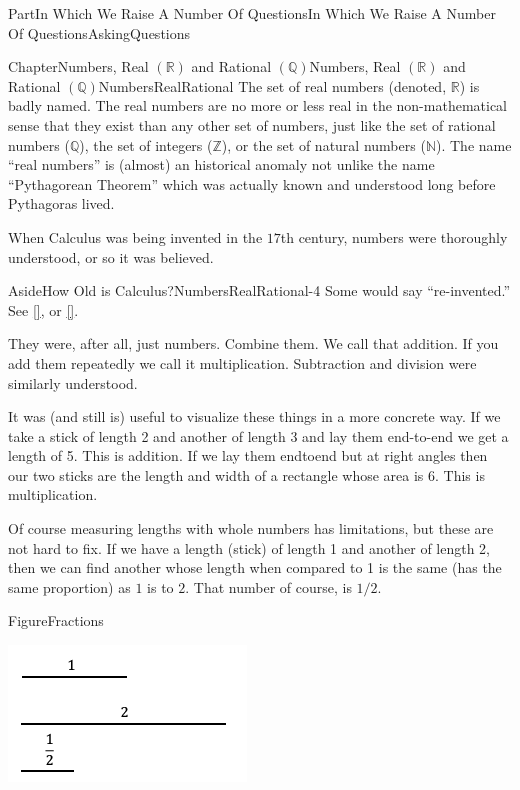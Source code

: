 \documentclass[oneside,10pt,]{book}
\newcommand{\xreffont}{\relax}
\numberwithin{equation}{part}
\newcommand{\RR}{\mathbb {R}}
\newcommand{\QQ}{\mathbb {Q}}
\newcommand{\NN}{\mathbb {N}}
\newcommand{\ZZ}{\mathbb {Z}}
\begin{document}
\begin{partptx}{Part}{In Which We Raise A Number Of Questions}{}{In Which We Raise A Number Of Questions}{}{}{AskingQuestions}
\begin{chapterptx}{Chapter}{Numbers, Real \(\left(\RR\right)\) and Rational \(\left(\QQ\right)\)}{}{Numbers, Real \(\left(\RR\right)\) and Rational \(\left(\QQ\right)\)}{}{}{NumbersRealRational}
\renewcommand*{\chaptername}{Chapter}
The set of real numbers (denoted, \(\RR\)) is badly named. The real numbers are no more or less real \textemdash{} in the non-mathematical sense that they exist \textemdash{} than any other set of numbers, just like the set of rational numbers (\(\QQ\)), the set of integers (\(\ZZ\)), or the set of natural numbers (\(\NN\)). The name ``real numbers'' is (almost) an historical anomaly not unlike the name ``Pythagorean Theorem'' which was actually known and understood long before Pythagoras lived.%
\par
When Calculus was being invented in the \(17\)th century, numbers were thoroughly understood, or so it was believed.%
\begin{aside}{Aside}{How Old is Calculus?}{NumbersRealRational-4}%
Some would say ``re-invented.'' See \hyperlink{russo96__forgot_revol}{[{\xreffont 13}]}, or \hyperlink{netz07__archim_codex}{[{\xreffont 9}]}.  %
\end{aside}
They were, after all, just numbers. Combine them. We call that addition. If you add them repeatedly we call it multiplication. Subtraction and division were similarly understood.%
\par
It was (and still is) useful to visualize these things in a more concrete way.  If we take a stick of length 2 and another of length 3 and lay them end-to-end we get a length of 5.  This is addition.  If we lay them end\textendash{}to\textendash{}end but at right angles then our two sticks are the length and width of a rectangle whose area is 6.  This is multiplication.%
\par
Of course measuring lengths with whole numbers has limitations, but these are not hard to fix. If we have a length (stick) of length 1 and another of length 2, then we can find another whose length when compared to 1 is the same (has the same proportion) as \(1\) is to \(2\). That number of course, is \(1/2\).%
\begin{figureptx}{Figure}{}{Fractions}{}%
\begin{image}{0.125}{0.75}{0.125}{}%
\includegraphics[width=\linewidth]{external/images/Fractions.png}

\end{image}
\end{figureptx}
\end{chapterptx}
\end{partptx}
\end{document}
